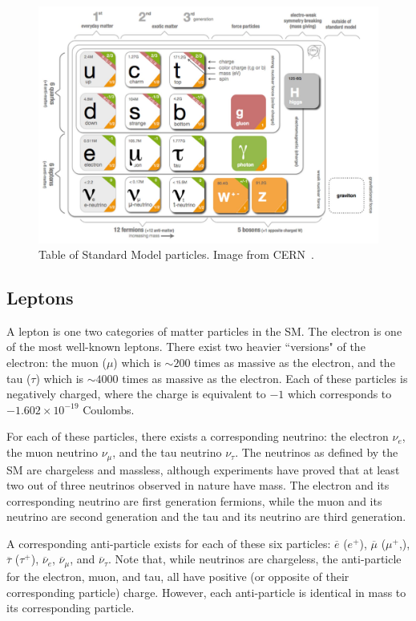 \begin{figure}[h]
    \centering
        \includegraphics[width=\textwidth]{F1/StandardModelTable}
        \caption{Table of Standard Model particles. Image from CERN~\cite{SMTable}.}
        \label{Fig:Intro:SMTable}
\end{figure}

\clearpage
\subsection{Leptons}
A lepton is one two categories of matter particles in the SM. The electron is one of the most well-known leptons. There exist two heavier ``versions" of the electron: the muon ($\mu$) which is $\sim 200$ times as massive as the electron, and the tau ($\tau$) which is $\sim 4000$ times as massive as the electron. Each of these particles is negatively charged, where the charge is equivalent to $-1$ which corresponds to $- 1.602 \times 10^{-19}$ Coulombs. 

For each of these particles, there exists a corresponding neutrino: the electron $\nu_e$, the muon neutrino $\nu_\mu$, and the tau neutrino $\nu_\tau$. The neutrinos as defined by the SM are chargeless and massless, although experiments have proved that at least two out of three neutrinos observed in nature have mass. The electron and its corresponding neutrino are first generation fermions, while the muon and its neutrino are second generation and the tau and its neutrino are third generation. 

A corresponding anti-particle exists for each of these six particles: $\overline{e}$ ($e^+$), $\overline{\mu}$ ($\mu^+$,), $\overline{\tau}$ ($\tau^+$), $\overline{\nu}_e$, $\overline{\nu}_\mu$, and $\overline{\nu}_\tau$. Note that, while neutrinos are chargeless, the anti-particle for the electron, muon, and tau, all have positive (or opposite of their corresponding particle) charge. However, each anti-particle is identical in mass to its corresponding particle.

